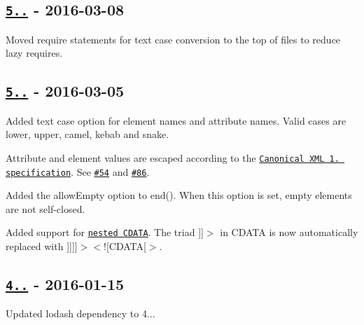 \subsection*{\href{https://github.com/oozcitak/xmlbuilder-js/compare/v5.0.0...v5.0.1}{\tt 5..} -\/ 2016-\/03-\/08}


\begin{DoxyItemize}
\item Moved require statements for text case conversion to the top of files to reduce lazy requires.
\end{DoxyItemize}

\subsection*{\href{https://github.com/oozcitak/xmlbuilder-js/compare/v4.2.1...v5.0.0}{\tt 5..} -\/ 2016-\/03-\/05}


\begin{DoxyItemize}
\item Added text case option for element names and attribute names. Valid cases are {\ttfamily lower}, {\ttfamily upper}, {\ttfamily camel}, {\ttfamily kebab} and {\ttfamily snake}.
\item Attribute and element values are escaped according to the \href{http://www.w3.org/TR/2000/WD-xml-c14n-20000119.html#charescaping}{\tt Canonical X\+ML 1. specification}. See \href{https://github.com/oozcitak/xmlbuilder-js/issues/54}{\tt \#54} and \href{https://github.com/oozcitak/xmlbuilder-js/issues/86}{\tt \#86}.
\item Added the {\ttfamily allow\+Empty} option to {\ttfamily end()}. When this option is set, empty elements are not self-\/closed.
\item Added support for \href{https://en.wikipedia.org/wiki/CDATA#Nesting}{\tt nested C\+D\+A\+TA}. The triad {\ttfamily \mbox{]}\mbox{]}$>$} in C\+D\+A\+TA is now automatically replaced with {\ttfamily \mbox{]}\mbox{]}\mbox{]}\mbox{]}$>$$<$!\mbox{[}C\+D\+A\+TA\mbox{[}$>$}.
\end{DoxyItemize}

\subsection*{\href{https://github.com/oozcitak/xmlbuilder-js/compare/v4.2.0...v4.2.1}{\tt 4..} -\/ 2016-\/01-\/15}


\begin{DoxyItemize}
\item Updated lodash dependency to 4...
\end{DoxyItemize}

